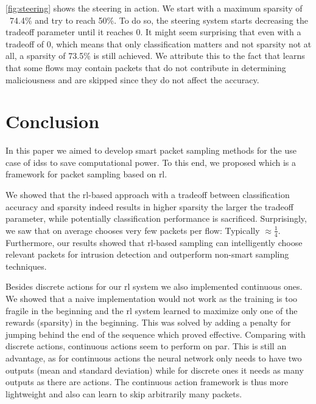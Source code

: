 \documentclass[conference]{IEEEtran}
\begin{document}
\autoref{fig:steering} shows the steering in action. We start with a maximum sparsity of ~74.4\% and try to reach 50\%. To do so, the steering system starts decreasing the tradeoff parameter until it reaches 0. It might seem surprising that even with a tradeoff of 0, which means that only classification matters and not sparsity not at all, a sparsity of 73.5\% is still achieved. We attribute this to the fact that \ours{} learns that some flows may contain packets that do not contribute in determining maliciousness and are skipped since they do not affect the accuracy. %


\section{Conclusion}
\label{sec:conclusion}
In this paper we aimed to develop smart packet sampling methods for the use case of \glspl{ids} to save computational power. To this end, we proposed \ours{} which is a framework for packet sampling based on \gls{rl}.

We showed that the \gls{rl}-based approach with a tradeoff between classification accuracy and sparsity indeed results in higher sparsity the larger the tradeoff parameter, while potentially classification performance is sacrificed. Surprisingly, we saw that \ours{} on average chooses very few packets per flow: Typically $\approx \frac{1}{4}$. Furthermore, our results showed that \gls{rl}-based sampling can intelligently choose relevant packets for intrusion detection and outperform non-smart sampling techniques.

Besides discrete actions for our \gls{rl} system we also implemented continuous ones. We showed that a naive implementation would not work as the training is too fragile in the beginning and the \gls{rl} system learned to maximize only one of the rewards (sparsity) in the beginning. This was solved by adding a penalty for jumping behind the end of the sequence which proved effective. Comparing with discrete actions, continuous actions seem to perform on par. This is still an advantage, as for continuous actions the neural network only needs to have two outputs (mean and standard deviation) while for discrete ones it needs as many outputs as there are actions. The continuous action framework is thus more lightweight and also can learn to skip arbitrarily many packets.
\end{document}
